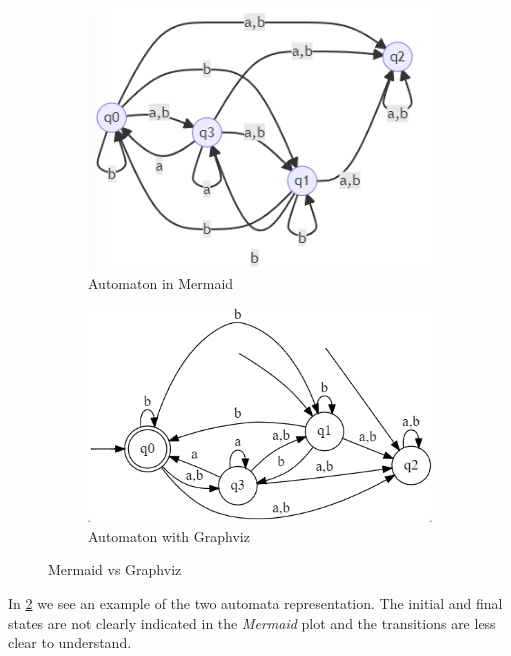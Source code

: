 \begin{figure}[!htb]
  \centering
  \begin{subfigure}[b]{0.3\textwidth}
    \includegraphics[width=\textwidth]{img/aut_mermaid.png}
    \caption{Automaton in Mermaid}
  \end{subfigure}
  \begin{subfigure}[b]{0.3\textwidth}
    \includegraphics[width=\textwidth]{img/aut_graphviz.png}
    \caption{Automaton with Graphviz}
    \label{fig:graphviz-aut}
  \end{subfigure}
  \caption{Mermaid vs Graphviz}
  \label{fig:mermaidGraphviz}
\end{figure}


In \cref{fig:mermaidGraphviz} we see an example of the two automata representation. The initial and final states are not clearly indicated in the \textit{Mermaid} plot and the transitions are less clear to understand.

